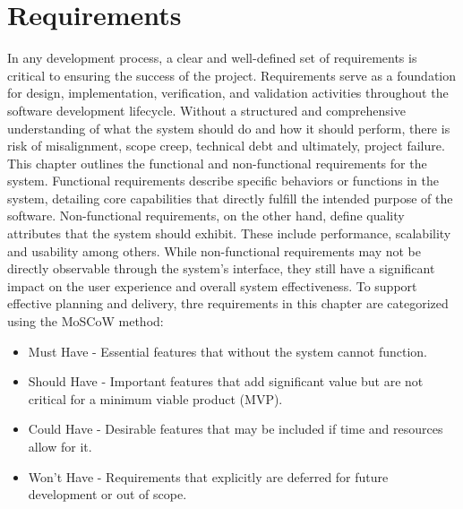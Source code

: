 \chapter{Requirements}
\label{chap:requirements}

In any development process, a clear and well-defined set of requirements is critical
to ensuring the success of the project. Requirements serve as a foundation for design, implementation,
verification, and validation activities throughout the software development lifecycle.
Without a structured and comprehensive understanding of what the system should do and how it 
should perform, there is risk of misalignment, scope creep, technical debt and ultimately, 
project failure. This chapter outlines the functional and non-functional requirements for the 
system. Functional requirements describe specific behaviors or functions in the system, detailing
core capabilities that directly fulfill the intended purpose of the software.
Non-functional requirements, on the other hand, define quality attributes that the system
should exhibit. These include performance, scalability and usability among others. While
non-functional requirements may not be directly observable through the system's interface, they
still have a significant impact on the user experience and overall system effectiveness.
To support effective planning and delivery, thre requirements in this chapter are categorized 
using the MoSCoW method:
\begin{itemize}
    \item Must Have - Essential features that without the system cannot function.
    \item Should Have - Important features that add significant value but are not critical 
    for a minimum viable product (MVP).
    \item Could Have - Desirable features that may be included if time and resources allow for it.
    \item Won't Have - Requirements that explicitly are deferred for future development or out of scope.
\end{itemize}



